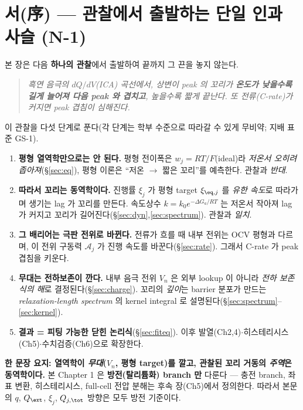 
\section*{서(序) — 관찰에서 출발하는 단일 인과 사슬 (N-1)}
본 장은 다음 \textbf{하나의 관찰}에서 출발하여 끝까지 그 끈을 놓지 않는다.
\begin{quote}\itshape
흑연 음극의 $dQ/dV$(ICA) 곡선에서, 상변이 peak 의 꼬리가 \textbf{온도가 낮을수록 길게 늘어져 다음
peak 와 겹치고}, 높을수록 짧게 끝난다. 또 전류(C-rate)가 커지면 peak 겹침이 심해진다.
\end{quote}
이 관찰을 다섯 단계로 푼다(각 단계는 학부 수준으로 따라갈 수 있게 무비약; 지배 표준 GS-1).
\begin{enumerate}[label=(\arabic*),leftmargin=2.0em]
\item \textbf{평형 열역학만으로는 안 된다.} 평형 전이폭은 $w_j=RT/F$(ideal)라 \emph{저온서 오히려
  좁아져}(\S\ref{sec:eq}), 평형 이론은 ``저온 $\to$ 짧은 꼬리''를 예측한다. 관찰과 \emph{반대}.
\item \textbf{따라서 꼬리는 동역학이다.} 진행률 $\xi_j$ 가 평형 target $\xi_{\eq,j}$ 를 \emph{유한
  속도}로 따라가며 생기는 lag 가 꼬리를 만든다. 속도상수 $k=k_0e^{-\Delta G_a/RT}$ 는 저온서 작아져
  lag 가 커지고 꼬리가 길어진다(\S\ref{sec:dyn},\ref{sec:spectrum}). 관찰과 \emph{일치}.
\item \textbf{그 배리어는 극판 전위로 바뀐다.} 전류가 흐를 때 내부 전위는 OCV 평형과 다르며, 이
  전위 구동력 $\mathcal A_j$ 가 진행 속도를 바꾼다(\S\ref{sec:rate}). 그래서 C-rate 가 peak 겹침을 키운다.
\item \textbf{무대는 전하보존이 깐다.} 내부 음극 전위 $V_n$ 은 외부 lookup 이 아니라 \emph{전하 보존식의
  해}로 결정된다(\S\ref{sec:charge}). 꼬리의 \emph{깊이}는 barrier 분포가 만드는 \emph{relaxation-length
  spectrum} 의 kernel integral 로 설명된다(\S\ref{sec:spectrum}--\ref{sec:kernel}).
\item \textbf{결과 = 피팅 가능한 닫힌 논리식}(\S\ref{sec:fiteq}). 이후 발열(Ch2,4)$\cdot$히스테리시스
  (Ch5)$\cdot$수치검증(Ch6)으로 확장한다.
\end{enumerate}
\noindent\textbf{한 문장 요지: 열역학이 \emph{무대}($V_n$, 평형 target)를 깔고, 관찰된 꼬리 거동의
\emph{주역}은 동역학이다.} 본 Chapter 1 은 \textbf{방전(탈리튬화) branch 만} 다룬다 — 충전 branch,
좌표 변환, 히스테리시스, full-cell 전압 분해는 후속 장(Ch5)에서 정의한다. 따라서 본문의 $q$,
$Q_\ext$, $\xi_j$, $Q_{j,\tot}$ 방향은 모두 방전 기준이다.

